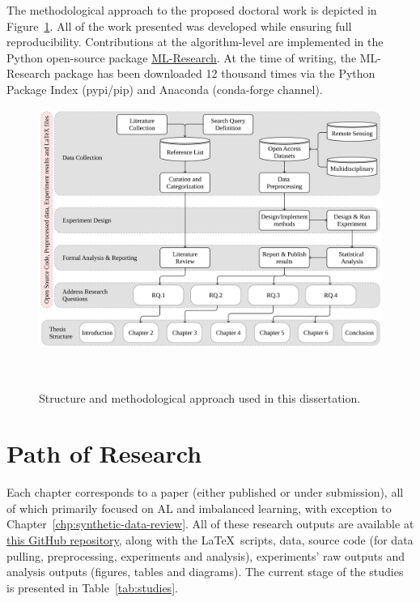 The methodological approach to the proposed doctoral work is depicted in
Figure~\ref{fig:phd_structure}. All of the work presented was developed while
ensuring full reproducibility. Contributions at the algorithm-level are
implemented in the Python open-source package 
\href{https://github.com/joaopfonseca/ml-research}{ML-Research}. At the time
of writing, the ML-Research package has been downloaded 12 thousand times via
the Python Package Index (pypi/pip) and Anaconda (conda-forge channel).

\begin{figure}[ht]
	\centering
    \includegraphics[width=\linewidth]{phd_structure}
    \caption{Structure and methodological approach used in this dissertation.
    }~\label{fig:phd_structure}
\end{figure}


\section{Path of Research}

Each chapter corresponds to a paper (either published or under submission),
all of which primarily focused on AL and imbalanced learning, with exception
to Chapter~\ref{chp:synthetic-data-review}. All of these research outputs are
available at \href{https://github.com/joaopfonseca/publications}{this GitHub
repository}, along with the \LaTeX\ scripts, data, source code (for data
pulling, preprocessing, experiments and analysis), experiments' raw outputs
and analysis outputs (figures, tables and diagrams). The current stage of the
studies is presented in Table~\ref{tab:studies}.


